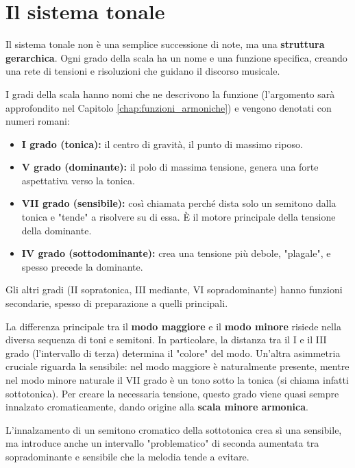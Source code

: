 \section{Il sistema tonale}
\label{sec:sistema_tonale}

Il sistema tonale non è una semplice successione di note, ma una \textbf{struttura gerarchica}. Ogni grado della scala ha un nome e una funzione specifica, creando una rete di tensioni e risoluzioni che guidano il discorso musicale.

\begin{definizione}
	\label{def:gradi_scala}
	I gradi della scala hanno nomi che ne descrivono la funzione (l'argomento sarà approfondito nel Capitolo \ref{chap:funzioni_armoniche}) e vengono denotati con numeri romani:
	\begin{itemize}
		\item \textbf{I grado (tonica):} il centro di gravità, il punto di massimo riposo.
		\item \textbf{V grado (dominante):} il polo di massima tensione, genera una forte aspettativa verso la tonica.
		\item \textbf{VII grado (sensibile):} così chiamata perché dista solo un semitono dalla tonica e "tende" a risolvere su di essa. È il motore principale della tensione della dominante.
		\item \textbf{IV grado (sottodominante):} crea una tensione più debole, "plagale", e spesso precede la dominante.
	\end{itemize}
	Gli altri gradi (II sopratonica, III mediante, VI sopradominante) hanno funzioni secondarie, spesso di preparazione a quelli principali.
\end{definizione}

La differenza principale tra il \textbf{modo maggiore} e il \textbf{modo minore} risiede nella diversa sequenza di toni e semitoni. In particolare, la distanza tra il I e il III grado (l'intervallo di terza) determina il "colore" del modo. Un'altra asimmetria cruciale riguarda la sensibile: nel modo maggiore è naturalmente presente, mentre nel modo minore naturale il VII grado è un tono sotto la tonica (si chiama infatti sottotonica). Per creare la necessaria tensione, questo grado viene quasi sempre innalzato cromaticamente, dando origine alla \textbf{scala minore armonica}.

 L'innalzamento di un semitono cromatico della sottotonica crea sì una sensibile, ma introduce anche un intervallo "problematico" di seconda aumentata tra sopradominante e sensibile che la melodia tende a evitare.

